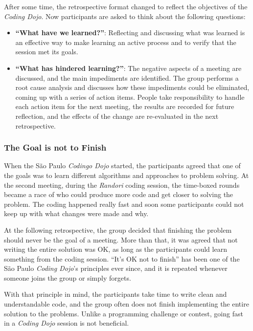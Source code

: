 After some time, the retrospective format changed to reflect the
objectives of the \emph{Coding Dojo}. Now participants are asked to
think about the following questions:

\begin{itemize}
\item \textbf{``What have we learned?''}: Reflecting and discussing
  what was learned is an effective way to make learning an active
  process and to verify that the session met its goals.
\item \textbf{``What has hindered learning?''}: The negative aspects
  of a meeting are discussed, and the main impediments are
  identified. The group performs a root cause analysis and discusses
  how these impediments could be eliminated, coming up with a series
  of action items. People take responsibility to handle each action
  item for the next meeting, the results are recorded for future
  reflection, and the effects of the change are re-evaluated in the
  next retrospective.
\end{itemize}

\subsubsection{The Goal is not to Finish}

When the São Paulo \emph{Codingo Dojo} started, the participants
agreed that one of the goals was to learn different algorithms and
approaches to problem solving. At the second meeting, during the
\emph{Randori} coding session, the time-boxed rounds became a race
of who could produce more code and get closer to solving the
problem. The coding happened really fast and soon some participants
could not keep up with what changes were made and why.

At the following retrospective, the group decided that finishing the
problem should never be the goal of a meeting. More than that, it was
agreed that not writing the entire solution was OK, as long as the
participants could learn something from the coding session. ``It's OK
not to finish'' has been one of the São Paulo \emph{Coding Dojo}'s
principles ever since, and it is repeated whenever someone joins the
group or simply forgets.

With that principle in mind, the participants take time to write clean and
understandable code, and the group often does not finish implementing the
entire solution to the problems. Unlike a programming challenge or contest,
going fast in a \emph{Coding Dojo} session is not beneficial.

